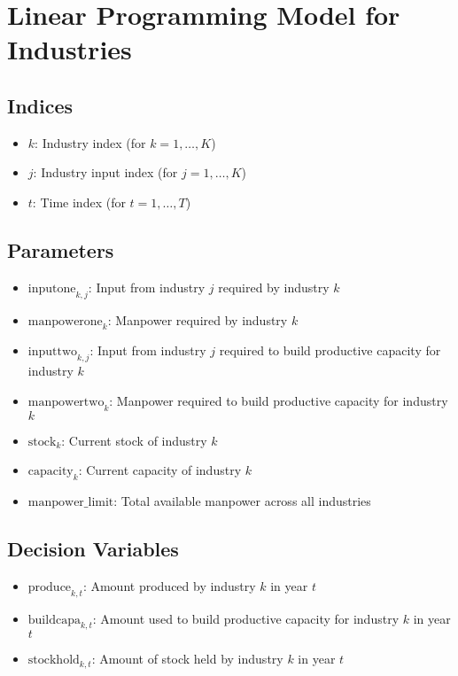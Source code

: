 \documentclass{article}
\begin{document}
\section*{Linear Programming Model for Industries}

\subsection*{Indices}
\begin{itemize}
    \item \( k \): Industry index (for \( k = 1, \ldots, K \))
    \item \( j \): Industry input index (for \( j = 1, \ldots, K \))
    \item \( t \): Time index (for \( t = 1, \ldots, T \))
\end{itemize}

\subsection*{Parameters}
\begin{itemize}
    \item \( \text{inputone}_{k, j} \): Input from industry \( j \) required by industry \( k \)
    \item \( \text{manpowerone}_{k} \): Manpower required by industry \( k \)
    \item \( \text{inputtwo}_{k, j} \): Input from industry \( j \) required to build productive capacity for industry \( k \)
    \item \( \text{manpowertwo}_{k} \): Manpower required to build productive capacity for industry \( k \)
    \item \( \text{stock}_{k} \): Current stock of industry \( k \)
    \item \( \text{capacity}_{k} \): Current capacity of industry \( k \)
    \item \( \text{manpower\_limit} \): Total available manpower across all industries
\end{itemize}

\subsection*{Decision Variables}
\begin{itemize}
    \item \( \text{produce}_{k, t} \): Amount produced by industry \( k \) in year \( t \)
    \item \( \text{buildcapa}_{k, t} \): Amount used to build productive capacity for industry \( k \) in year \( t \)
    \item \( \text{stockhold}_{k, t} \): Amount of stock held by industry \( k \) in year \( t \)
\end{itemize}
\end{document}
